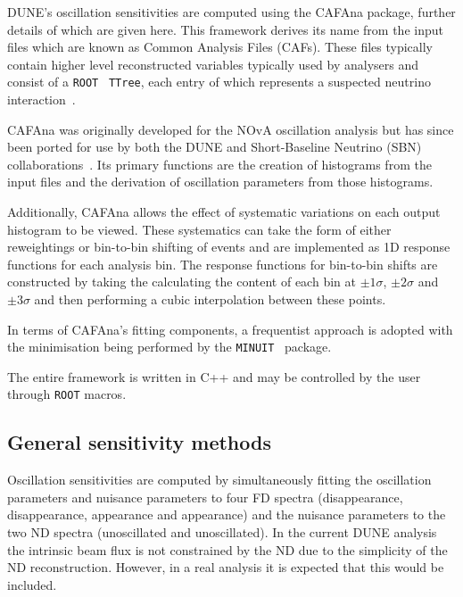 DUNE's oscillation sensitivities are computed using the CAFAna package, further details of which are given here.
This framework derives its name from the input files which are known as Common Analysis Files (CAFs).
These files typically contain higher level reconstructed variables typically used by analysers and consist of a \texttt{ROOT}~\cite{root} \texttt{TTree}, each entry of which represents a suspected neutrino interaction~\cite{backhouse2015}.

CAFAna was originally developed for the NOvA oscillation analysis but has since been ported for use by both the DUNE and Short-Baseline Neutrino (SBN) collaborations~\cite{cafana}.
Its primary functions are the creation of histograms from the input files and the derivation of oscillation parameters from those histograms.

Additionally, CAFAna allows the effect of systematic variations on each output histogram to be viewed. 
These systematics can take the form of either reweightings or bin-to-bin shifting of events and are implemented as 1D response functions for each analysis bin.
The response functions for bin-to-bin shifts are constructed by taking the calculating the content of each bin at $\pm 1 \sigma$, $\pm 2 \sigma$ and $\pm 3 \sigma$ and then performing a cubic interpolation between these points.

In terms of CAFAna's fitting components, a frequentist approach is adopted with the minimisation being performed by the \texttt{MINUIT}~\cite{minuit} package.

The entire framework is written in C++ and may be controlled by the user through \texttt{ROOT} macros.

\subsection{General sensitivity methods}
\label{sec:dune_lbl:sensitivities:general}

Oscillation sensitivities are computed by simultaneously fitting the oscillation parameters and nuisance parameters to four FD spectra (\numu disappearance, \anumu disappearance, \nue appearance and \anue appearance) and the nuisance parameters to the two ND spectra (\numu unoscillated and \anumu unoscillated).
In the current DUNE analysis the intrinsic \nue beam flux is not constrained by the ND due to the simplicity of the ND reconstruction.
However, in a real analysis it is expected that this would be included.

